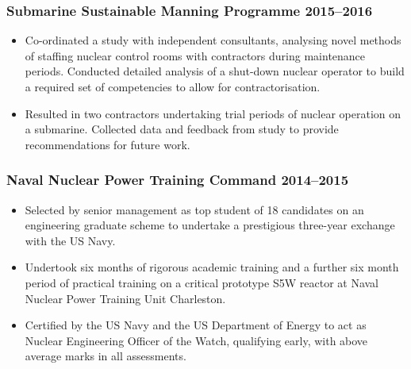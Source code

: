 \documentclass[a4paper, oneside, final, 11pt]{scrartcl} %
\begin{document}
\subsubsection*{Submarine Sustainable Manning Programme \hfill 2015--2016}  
\normalfont
\begin{itemize}
	\item Co-ordinated a study with independent consultants, analysing novel methods of staffing nuclear control rooms with contractors during maintenance periods. Conducted detailed analysis of a shut-down nuclear operator to build a required set of competencies to allow for contractorisation.
	
	\item  Resulted in two contractors undertaking trial periods of nuclear operation on a submarine. Collected data and feedback from study to provide recommendations for future work. \end{itemize}


				
\subsubsection*{Naval Nuclear Power Training Command \hfill 2014--2015}  
\normalfont
\begin{itemize}
	\item Selected by senior management as top student of 18 candidates on an engineering graduate scheme to undertake a prestigious three-year exchange with the US Navy. 
	
	\item Undertook six months of rigorous academic training and a further six month period of practical training on a critical prototype S5W reactor at Naval Nuclear Power Training Unit Charleston.
	\item Certified by the US Navy and the US Department of Energy to act as Nuclear Engineering Officer of the Watch, qualifying early, with above average marks in all assessments.
\end{itemize}


				
\end{document}
